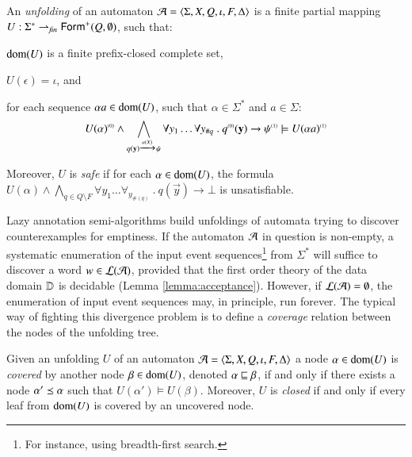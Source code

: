 \begin{definition}\label{def:unfolding}
  An \emph{unfolding} of an automaton $\mathcal{A} =
  \langle \Sigma,X,Q,\iota,F,\Delta \rangle$ is a finite partial mapping $U :
  \Sigma^* \rightharpoonup_{\mathit{fin}} \mathsf{Form}^+(Q,\emptyset)$,
  such that: \begin{compactenum}
  \item\label{it1:unfolding} $\mathrm{dom}(U)$ is a finite prefix-closed
    complete set,
  \item\label{it2:unfolding} $U(\epsilon) = \iota$, and
  \item\label{it3:unfolding} for each sequence $\alpha a \in \mathrm{dom}(U)$,
    such that $\alpha \in \Sigma^*$ and $a \in \Sigma$:
    \[{U(\alpha)}^{\scriptscriptstyle{({0})}} \wedge
    \bigwedge_{q(\mathbf y) \xrightarrow{{\scriptscriptstyle a(X)}}_{{\scriptstyle }} \psi} \forall y_1 \ldots
    \forall y_{\#q} ~.~ {q}^{\scriptscriptstyle{({0})}}(\mathbf y) \rightarrow
    {\psi}^{\scriptscriptstyle{({1})}} \models {U(\alpha a)}^{\scriptscriptstyle{({1})}}\]
  \end{compactenum}
  Moreover, $U$ is \emph{safe} if for each $\alpha \in \mathrm{dom}(U)$, the
  formula $U(\alpha) \wedge \bigwedge_{q \in Q \setminus F} \forall
  y_1 \ldots \forall_{y_{\#(q)}} ~.~ q(\vec{y}) \rightarrow \bot$ is
  unsatisfiable. 
\end{definition}

Lazy annotation semi-algorithms \cite{McMillan06,McMillan14} build
unfoldings of automata trying to discover counterexamples for
emptiness. If the automaton $\mathcal{A}$ in question is non-empty, a
systematic enumeration of the input event sequences\footnote{For
  instance, using breadth-first search.} from $\Sigma^*$ will suffice
to discover a word $w \in {\mathcal L}({\mathcal{A}})$, provided that the first order
theory of the data domain $\mathbb{D}$ is decidable (Lemma
\ref{lemma:acceptance}). However, if ${\mathcal L}({\mathcal{A}}) = \emptyset$, the
enumeration of input event sequences may, in principle, run
forever. The typical way of fighting this divergence problem is to
define a \emph{coverage} relation between the nodes of the unfolding
tree.

\begin{definition}\label{def:coverage}
  Given an unfolding $U$ of an automaton $\mathcal{A} =
  \langle \Sigma,X,Q,\iota,F,\Delta \rangle$ a node $\alpha \in \mathrm{dom}(U)$ is
  \emph{covered} by another node $\beta \in \mathrm{dom}(U)$, denoted $\alpha
  \sqsubseteq \beta$, if and only if there exists a node $\alpha' \preceq
  \alpha$ such that $U(\alpha') \models U(\beta)$. Moreover, $U$ is
  \emph{closed} if and only if every leaf from $\mathrm{dom}(U)$ is covered by
  an uncovered node.
\end{definition}

